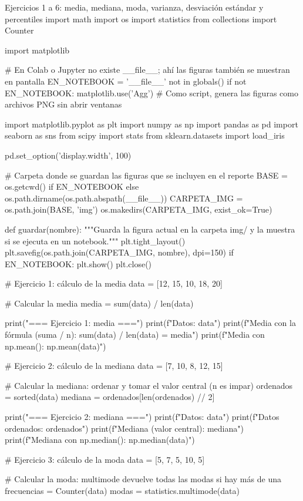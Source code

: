 \documentclass[11pt,letterpaper]{article}
\begin{document}
\begin{codigo}[label=cod:ej16]{Ejercicios 1 a 6: media, mediana, moda, varianza, desviación estándar y percentiles}
import math
import os
import statistics
from collections import Counter

import matplotlib

# En Colab o Jupyter no existe __file__; ahí las figuras también se muestran en pantalla
EN_NOTEBOOK = '__file__' not in globals()
if not EN_NOTEBOOK:
    matplotlib.use('Agg')  # Como script, genera las figuras como archivos PNG sin abrir ventanas

import matplotlib.pyplot as plt
import numpy as np
import pandas as pd
import seaborn as sns
from scipy import stats
from sklearn.datasets import load_iris

pd.set_option('display.width', 100)

# Carpeta donde se guardan las figuras que se incluyen en el reporte
BASE = os.getcwd() if EN_NOTEBOOK else os.path.dirname(os.path.abspath(__file__))
CARPETA_IMG = os.path.join(BASE, 'img')
os.makedirs(CARPETA_IMG, exist_ok=True)


def guardar(nombre):
    """Guarda la figura actual en la carpeta img/ y la muestra si se ejecuta en un notebook."""
    plt.tight_layout()
    plt.savefig(os.path.join(CARPETA_IMG, nombre), dpi=150)
    if EN_NOTEBOOK:
        plt.show()
    plt.close()


# Ejercicio 1: cálculo de la media
data = [12, 15, 10, 18, 20]

# Calcular la media
media = sum(data) / len(data)

print("=== Ejercicio 1: media ===")
print(f"Datos: {data}")
print(f"Media con la fórmula (suma / n): {sum(data)} / {len(data)} = {media}")
print(f"Media con np.mean(): {np.mean(data)}")

# Ejercicio 2: cálculo de la mediana
data = [7, 10, 8, 12, 15]

# Calcular la mediana: ordenar y tomar el valor central (n es impar)
ordenados = sorted(data)
mediana = ordenados[len(ordenados) // 2]

print("\n=== Ejercicio 2: mediana ===")
print(f"Datos: {data}")
print(f"Datos ordenados: {ordenados}")
print(f"Mediana (valor central): {mediana}")
print(f"Mediana con np.median(): {np.median(data)}")

# Ejercicio 3: cálculo de la moda
data = [5, 7, 5, 10, 5]

# Calcular la moda: multimode devuelve todas las modas si hay más de una
frecuencias = Counter(data)
modas = statistics.multimode(data)


\end{codigo}
\end{document}
